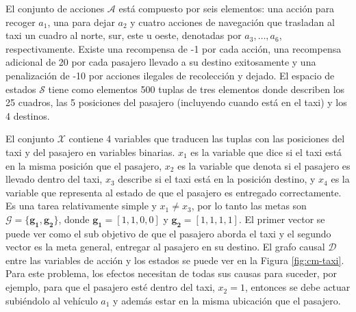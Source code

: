 El conjunto de acciones $\mathcal{A}$ está compuesto por seis elementos: una acción para recoger $a_1$, una para dejar $a_2$ y
cuatro acciones de 
navegación que trasladan al taxi un cuadro al norte, sur, 
este u oeste, denotadas por $a_3, \dots, a_6$, respectivamente.
Existe una recompensa de -1 por cada acción, una recompensa adicional de 20 por cada pasajero llevado a su destino 
exitosamente y una penalización de -10 por acciones ilegales
de recolección y dejado.
El espacio de estados $\mathcal{S}$ tiene como elementos 
500 tuplas de tres elementos donde describen los 25 cuadros, las 5 posiciones del pasajero (incluyendo cuando está en el taxi) y los 4 destinos.


El conjunto $\mathcal{X}$ contiene 4 variables que traducen las tuplas con las posiciones del taxi y del pasajero en variables binarias. $x_1$
es la variable que dice si el taxi está en la misma posición que el
pasajero, $x_2$ es la variable que denota si el pasajero es llevado dentro del taxi, $x_3$ describe si el taxi está en la posición destino,
y $x_4$ es la variable que representa al estado de que el pasajero es entregado correctamente. Es una tarea relativamente simple y $x_1 \neq x_3$, por lo tanto las metas son $\mathcal{G} = \{\mathbf{g_1}, \mathbf{g_2}\}$, donde $\mathbf{g_1} = [1, 1, 0 , 0]$ y $\mathbf{g_2} = [1,1,1,1]$. El primer vector se puede ver como el sub objetivo de que el pasajero aborda el taxi y el segundo vector es la meta general, 
entregar al pasajero en su destino.
El grafo causal $\mathcal{D}$ entre las variables de acción y los estados se puede 
ver en la Figura \ref{fig:cm-taxi}. Para este problema, los efectos
necesitan de todas sus causas para suceder, por ejemplo, para que el
pasajero esté dentro del taxi, $x_2 = 1$, entonces se debe actuar
subiéndolo al vehículo $a_1$ y además estar en la misma ubicación que
el pasajero.

